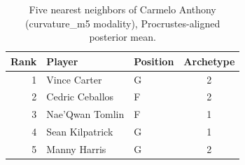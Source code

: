 \begin{table}[htbp]
  \centering\small
  \begin{tabular}{rllc}
    \toprule
    Rank & Player & Position & Archetype \\
    \midrule
    1 & Vince Carter & G & 2 \\
    2 & Cedric Ceballos & F & 2 \\
    3 & Nae'Qwan Tomlin & F & 1 \\
    4 & Sean Kilpatrick & G & 1 \\
    5 & Manny Harris & G & 2 \\
    \bottomrule
  \end{tabular}
  \caption{Five nearest neighbors of Carmelo Anthony (curvature_m5 modality), Procrustes-aligned posterior mean.}
  \label{tab:Carmelo_Anthony_neighbors_curvature_m5}
\end{table}

